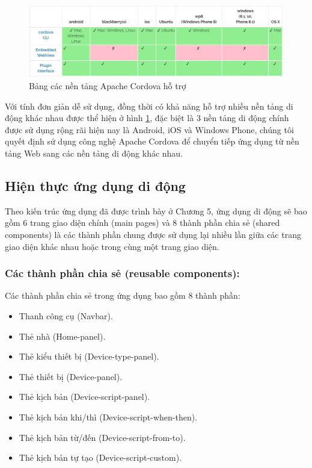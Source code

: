 \documentclass[12pt,a4paper,oneside]{extbook}
\begin{document}
\begin{figure}[h]
  \centering
     \includegraphics[width=15cm]{6-cordova-platforms}
  \caption{Bảng các nền tảng Apache Cordova hỗ trợ}\label{fig:6-cordova-platforms}
\end{figure}

\noindent
Với tính đơn giản dễ sử dụng, đồng thời có khả năng hỗ trợ nhiều nền tảng di động khác nhau được thể hiện ở hình \ref{fig:6-cordova-platforms}, đặc biệt là 3 nền tảng di động chính được sử dụng rộng rãi hiện nay là Android, iOS và Windows Phone, chúng tôi quyết định sử dụng công nghệ Apache Cordova để chuyển tiếp ứng dụng từ nền tảng Web sang các nền tảng di động khác nhau.

\subsection{Hiện thực ứng dụng di động}
Theo kiến trúc ứng dụng đã được trình bày ở Chương 5, ứng dụng di động sẽ bao gồm 6 trang giao diện chính (main pages) và 8 thành phần chia sẻ (shared components) là các thành phần chung được sử dụng lại nhiều lần giữa các trang giao diện khác nhau hoặc trong cùng một trang giao diện.

\subsubsection{Các thành phần chia sẻ (reusable components):}

\noindent
Các thành phần chia sẻ trong ứng dụng bao gồm 8 thành phần:

\begin{itemize}[topsep=1mm,itemsep=-0.5mm]
\item Thanh công cụ (Navbar).
\item Thẻ nhà (Home-panel).
\item Thẻ kiểu thiết bị (Device-type-panel).
\item Thẻ thiết bị (Device-panel).
\item Thẻ kịch bản (Device-script-panel).
\item Thẻ kịch bản khi/thì (Device-script-when-then).
\item Thẻ kịch bản từ/đến (Device-script-from-to).
\item Thẻ kịch bản tự tạo (Device-script-custom).
\vspace{1mm}
\end{itemize}
\end{document}
